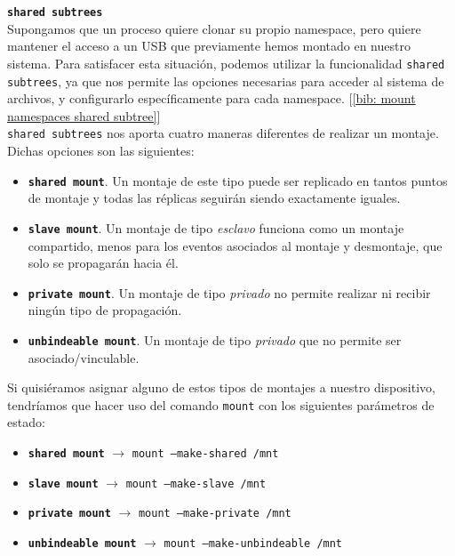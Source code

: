 \documentclass[12pt]{article}
\begin{document}
	\pagebreak
	
	\noindent \textbf{\large \texttt{shared subtrees}}\\
	
	\noindent Supongamos que un proceso quiere clonar su propio namespace, pero quiere mantener el acceso a un USB que previamente hemos montado en nuestro sistema. Para satisfacer esta situación, podemos utilizar la funcionalidad \texttt{shared subtrees}, ya que nos permite las opciones necesarias para acceder al sistema de archivos, y configurarlo específicamente para cada namespace. [\ref{bib: mount namespaces shared subtree}] \\
	
	\noindent \texttt{shared subtrees} nos aporta cuatro maneras diferentes de realizar un montaje. Dichas opciones son las siguientes:
	\begin{itemize}
		\item \textbf{\texttt{shared mount}}. Un montaje de este tipo puede ser replicado en tantos puntos de montaje y todas las réplicas seguirán siendo exactamente iguales.
		\item \textbf{\texttt{slave mount}}. Un montaje de tipo \textit{esclavo} funciona como un montaje compartido, menos para los eventos asociados al montaje y desmontaje, que solo se propagarán hacia él.
		\item \textbf{\texttt{private mount}}. Un montaje de tipo \textit{privado} no permite realizar ni recibir ningún tipo de propagación.
		\item \textbf{\texttt{unbindeable mount}}. Un montaje de tipo \textit{privado} que no permite ser asociado/vinculable.
	\end{itemize}

	\noindent Si quisiéramos asignar alguno de estos tipos de montajes a nuestro dispositivo, tendríamos que hacer uso del comando \texttt{mount} con los siguientes parámetros de estado:
	\begin{itemize}
		\item \textbf{\texttt{shared mount}} $\rightarrow$ \texttt{mount --make-shared /mnt}
		\item \textbf{\texttt{slave mount}} $\rightarrow$ \texttt{mount --make-slave /mnt}
		\item \textbf{\texttt{private mount}} $\rightarrow$ \texttt{mount --make-private /mnt}
		\item \textbf{\texttt{unbindeable mount}} $\rightarrow$ \texttt{mount --make-unbindeable /mnt}
	\end{itemize}
\end{document}
